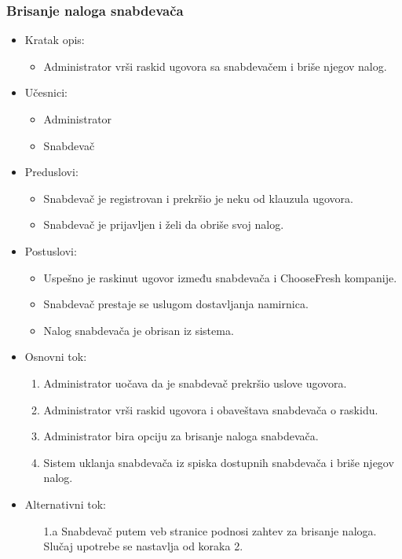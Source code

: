 \subsubsection{Brisanje naloga snabdevača}

\begin{itemize}
    \item Kratak opis:
        \begin{itemize}
            \item Administrator vrši raskid ugovora sa snabdevačem i briše njegov nalog.
        \end{itemize}
    \item Učesnici:
        \begin{itemize}
            \item Administrator
            \item Snabdevač
        \end{itemize}
    \item Preduslovi:
        \begin{itemize}
            \item Snabdevač je registrovan i prekršio je neku od klauzula ugovora.
            \item Snabdevač je prijavljen i želi da obriše svoj nalog.
            
            
        \end{itemize}
    \item Postuslovi:
        \begin{itemize}
            \item Uspešno je raskinut ugovor između snabdevača i ChooseFresh kompanije.
            \item Snabdevač prestaje se uslugom dostavljanja namirnica.
            \item Nalog snabdevača je obrisan iz sistema.
        \end{itemize}
    \item Osnovni tok:
         \begin{enumerate}
            \item Administrator uočava da je snabdevač prekršio uslove ugovora.
            \item Administrator vrši raskid ugovora i obaveštava snabdevača o raskidu.
            \item Administrator bira opciju za brisanje naloga snabdevača.
            \item Sistem uklanja snabdevača iz spiska dostupnih snabdevača i briše njegov nalog.
        \end{enumerate}
    \item Alternativni tok:
        \begin{itemize}
            \item[1.a] Snabdevač putem veb stranice podnosi zahtev za brisanje naloga. Slučaj upotrebe se nastavlja od koraka 2.
        \end{itemize}
\end{itemize}

